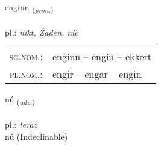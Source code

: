 \documentclass[frontgrid, backgrid]{flacards}\usepackage[]{graphicx}\usepackage[]{xcolor}
\begin{document}
\renewcommand{\flhead}{\vskip5pt \fboxsep=0pt {\small\bfseries\footnotesize Fornafn | zaimek}}
\renewcommand{\fcfoot}{\vskip5pt \fboxsep=0pt \hspace{2pt}{\small\bfseries\footnotesize 1K}}

\renewcommand{\blhead}{\vskip5pt {\small\bfseries\footnotesize Fornafn | zaimek }}
\renewcommand{\bcfoot}{\vskip5pt \hspace{2pt}{\small\bfseries\footnotesize 1K}}


{enginn \small{\textsubscript{(\textit{pron.})}} \\[1ex] %
\textphonetic{[eiɲcɪn]} \\
pl.: \emph{nikt, Żaden, nic} \\  [2ex]
\renewcommand*{\arraystretch}{0.8}
\begin{tabular}{ll}
\textsc{sg.nom.}: & enginn  --  engin -- ekkert \\ 
\textsc{pl.nom.}: & engir -- engar -- engin
\end{tabular}
}


\renewcommand{\flhead}{\vskip5pt \fboxsep=0pt {\small\bfseries\footnotesize Atviksorð | przysłówek}}
\renewcommand{\fcfoot}{\vskip5pt \fboxsep=0pt \hspace{2pt}{\small\bfseries\footnotesize 1K}}

\renewcommand{\blhead}{\vskip5pt {\small\bfseries\footnotesize Atviksorð | przysłówek }}
\renewcommand{\bcfoot}{\vskip5pt \hspace{2pt}{\small\bfseries\footnotesize 1K}}


{nú \small{\textsubscript{(\textit{adv.})}} \\[1ex]
\textphonetic{[nuː]} \\
pl.: \emph{teraz} \\  [2ex]
nú (Indeclinable)}

\renewcommand{\flhead}{\vskip5pt \fboxsep=0pt {\small\bfseries\footnotesize Sagnorð | czasownik}}
\renewcommand{\fcfoot}{\vskip5pt \fboxsep=0pt \hspace{2pt}{\small\bfseries\footnotesize 1K}}
\end{document}
